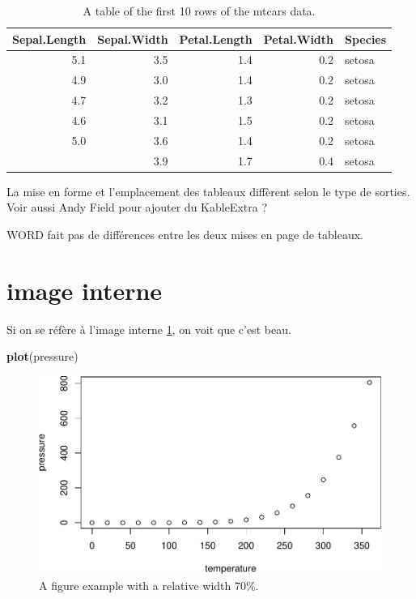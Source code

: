 \documentclass[
  french,
]{article}
\newenvironment{Shaded}{\begin{snugshade}}{\end{snugshade}}
\newcommand{\KeywordTok}[1]{\textcolor[rgb]{0.13,0.29,0.53}{\textbf{#1}}}
\newcommand{\NormalTok}[1]{#1}
\begin{document}
\begin{table}

\caption{\label{tab:table-single}A table of the first 10 rows of the mtcars data.}
\centering
\begin{tabular}[t]{rrrrl}
\toprule
Sepal.Length & Sepal.Width & Petal.Length & Petal.Width & Species\\
\midrule
5.1 & 3.5 & 1.4 & 0.2 & setosa\\
4.9 & 3.0 & 1.4 & 0.2 & setosa\\
4.7 & 3.2 & 1.3 & 0.2 & setosa\\
4.6 & 3.1 & 1.5 & 0.2 & setosa\\
5.0 & 3.6 & 1.4 & 0.2 & setosa\\
\addlinespace
5.4 & 3.9 & 1.7 & 0.4 & setosa\\
\bottomrule
\end{tabular}
\end{table}

La mise en forme et l'emplacement des tableaux diffèrent selon le type de sorties. Voir aussi Andy Field pour ajouter du KableExtra ?

WORD fait pas de différences entre les deux mises en page de tableaux.

\hypertarget{image-interne}{%
\section{image interne}\label{image-interne}}

Si on se réfère à l'image interne \ref{fig:pressure}, on voit que c'est beau.

\begin{Shaded}
\begin{Highlighting}[]
\KeywordTok{plot}\NormalTok{(pressure)}
\end{Highlighting}
\end{Shaded}

\begin{figure}
\includegraphics[width=0.7\linewidth]{essai_files/figure-latex/pressure-1} \caption{A figure example with a relative width 70\%.}\label{fig:pressure}
\end{figure}
\end{document}
